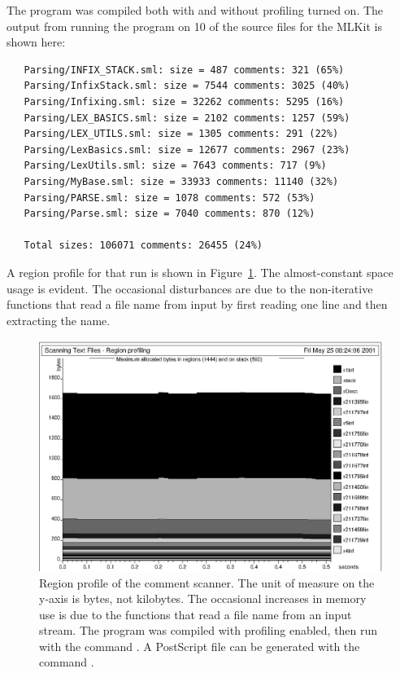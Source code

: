 \documentclass[12pt]{book}
\begin{document}
The program was compiled both with and without profiling turned on.
The output from running the program on 10 of the source files for the
MLKit is shown here:
\begin{verbatim}
   Parsing/INFIX_STACK.sml: size = 487 comments: 321 (65%)
   Parsing/InfixStack.sml: size = 7544 comments: 3025 (40%)
   Parsing/Infixing.sml: size = 32262 comments: 5295 (16%)
   Parsing/LEX_BASICS.sml: size = 2102 comments: 1257 (59%)
   Parsing/LEX_UTILS.sml: size = 1305 comments: 291 (22%)
   Parsing/LexBasics.sml: size = 12677 comments: 2967 (23%)
   Parsing/LexUtils.sml: size = 7643 comments: 717 (9%)
   Parsing/MyBase.sml: size = 33933 comments: 11140 (32%)
   Parsing/PARSE.sml: size = 1078 comments: 572 (53%)
   Parsing/Parse.sml: size = 7040 comments: 870 (12%)

   Total sizes: 106071 comments: 26455 (24%)
\end{verbatim}
A region profile for that run is shown in Figure~\ref{scan.fig}.  The
almost-constant space usage is evident. The occasional disturbances
are due to the non-iterative functions that read a file name from
input by first reading one line and then extracting the name.
\begin{figure}
\begin{center}
\includegraphics{scan.ps}
\end{center}
\caption{Region profile of the comment scanner. The unit of measure on 
  the y-axis is bytes, not kilobytes. The occasional increases in
  memory use is due to the functions that read a file name from an
  input stream.  The program was compiled with profiling enabled, then
  run with the command . A PostScript file  can be
  generated with the command .  }
\label{scan.fig}
\end{figure}
\end{document}
